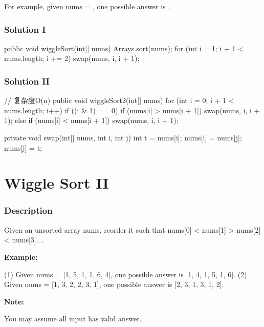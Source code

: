 For example, given nums = \code{[3, 5, 2, 1, 6, 4]}, one possible answer is \code{[1, 6, 2, 5, 3, 4]}.

\subsubsection{Solution I}

\begin{Code}
public void wiggleSort(int[] nums) {
    Arrays.sort(nums);
    for (int i = 1; i + 1 < nums.length; i += 2) {
        swap(nums, i, i + 1);
    }
}
\end{Code}

\subsubsection{Solution II}
\begin{Code}
// 复杂度O(n)
public void wiggleSort2(int[] nums) {
    for (int i = 0; i + 1 < nums.length; i++) {
        if ((i & 1) == 0) {
            if (nums[i] > nums[i + 1]) {
                swap(nums, i, i + 1);
            }
        } else {
            if (nums[i] < nums[i + 1]) {
                swap(nums, i, i + 1);
            }
        }
    }
}

private void swap(int[] nums, int i, int j) {
    int t = nums[i];
    nums[i] = nums[j];
    nums[j] = t;
}

\end{Code}

\newpage

\section{Wiggle Sort II} %

\subsubsection{Description}
Given an unsorted array nums, reorder it such that nums[0] < nums[1] > nums[2] < nums[3]....

\textbf{Example:}
\begin{Code}
(1) Given nums = [1, 5, 1, 1, 6, 4], one possible answer is [1, 4, 1, 5, 1, 6].
(2) Given nums = [1, 3, 2, 2, 3, 1], one possible answer is [2, 3, 1, 3, 1, 2].
\end{Code}

\textbf{Note:}

You may assume all input has valid answer.

